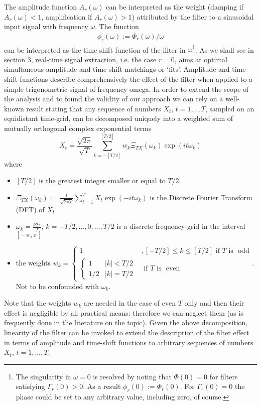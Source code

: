 \documentclass[11pt]{article}
\begin{document}
The amplitude function \(A_r(\omega)\) can be interpreted as the weight (damping if \(A_r(\omega)<1\), amplification if
\(A_r(\omega)>1\)) attributed by the filter to a sinusoidal input signal
with frequency \(\omega\). The function
\begin{eqnarray}\label{tsfunc}
\phi_r(\omega):={\Phi}_r(\omega)/\omega
\end{eqnarray}
can be interpreted as the {time shift function} of the
filter in \(\omega\)\footnote{The singularity in $\omega=0$ is resolved by noting that $\Phi(0)=0$ for filters satisfying $\Gamma_r(0)>0$. As a result $\phi_r(0):=\dot{\Phi}_r(0)$. For $\Gamma_r(0)=0$ the phase could be set to any arbitrary value, including zero, of course.}.  As we shall see in section 3, real-time signal
extraction, i.e. the case $r=0$, aims at optimal simultaneous amplitude and time shift
matchings or `fits'. Amplitude and time-shift functions describe comprehensively  the effect of the filter when applied to a simple trigonometric signal of frequency omega. In order to extend the scope of the analysis and to found the validity of our approach we can rely on a well-known result stating that any sequence of numbers $X_t$, $t=1,..,T$, sampled on an equidistant time-grid, can be decomposed uniquely into a weighted sum of mutually orthogonal complex exponential terms
\[X_t=\frac{\sqrt{2\pi}}{\sqrt{ T}}\sum_{k=-[T/2]}^{[T/2]} w_k\Xi_{TX}(\omega_k)\exp(it\omega_k )\]
where 
\begin{itemize}
\item $[T/2]$ is the greatest integer smaller or equal to $T/2$.
\item $\Xi_{TX}(\omega_k):=\frac{1}{\sqrt{2\pi T}}\sum_{t=1}^T X_t\exp(-it\omega_k)$ is the Discrete Fourier Transform (DFT) of $X_t$
\item $\omega_k=\frac{k2\pi}{T}$, $k=-T/2,...,0,...,T/2$ is a discrete frequency-grid in the interval $[-\pi,\pi]$
\item the weights $w_k=\left\{\begin{array}{cc}1&,[-T/2]\leq k\leq [T/2] \textrm{~if~} T \textrm{~is ~odd}\\
\left\{\begin{array}{cc}1&|k|<T/2\\1/2&|k|=T/2\end{array}\right.&\textrm{~if~} T \textrm{~is ~even}
\end{array}\right.$. Not to be confounded with $\omega_k$.
\end{itemize}
Note that the weights $w_k$ are needed in the case of even $T$ only and then their effect is negligible by all practical means: therefore we can neglect them (as is frequently done in the literature on the topic). Given the above decomposition, linearity of the filter can be invoked to extend the description of the filter effect in terms of amplitude and time-shift functions to arbitrary sequences of numbers $X_t$, $t=1,...,T$.\\
\end{document}
